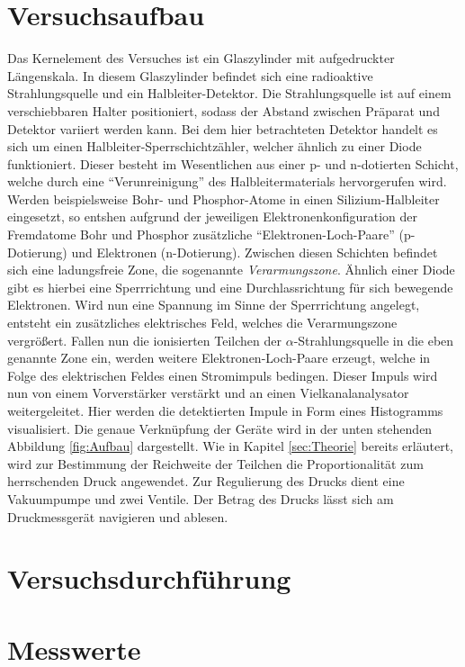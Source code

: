 


\section{Versuchsaufbau}
\label{sec:Versuchsaufbau}

Das Kernelement des Versuches ist ein Glaszylinder mit aufgedruckter Längenskala. In diesem Glaszylinder befindet 
sich eine radioaktive Strahlungsquelle und ein Halbleiter-Detektor. Die Strahlungsquelle ist auf einem verschiebbaren Halter 
positioniert, sodass der Abstand zwischen Präparat und Detektor variiert werden kann. Bei dem hier betrachteten Detektor 
handelt es sich um einen Halbleiter-Sperrschichtzähler, welcher ähnlich zu einer Diode funktioniert. Dieser besteht im 
Wesentlichen aus einer p- und n-dotierten Schicht, welche durch eine \enquote{Verunreinigung} des Halbleitermaterials 
hervorgerufen wird. Werden beispielsweise Bohr- und Phosphor-Atome in einen Silizium-Halbleiter eingesetzt, so entshen aufgrund 
der jeweiligen Elektronenkonfiguration der Fremdatome Bohr und Phosphor zusätzliche \enquote{Elektronen-Loch-Paare} (p-Dotierung)
und Elektronen (n-Dotierung). Zwischen diesen Schichten befindet sich eine ladungsfreie Zone, die sogenannte 
\emph{Verarmungszone}. Ähnlich einer Diode gibt es hierbei eine Sperrrichtung und eine Durchlassrichtung für sich bewegende Elektronen.
Wird nun eine Spannung im Sinne der Sperrrichtung angelegt, entsteht ein zusätzliches elektrisches Feld, welches die Verarmungszone 
vergrößert. Fallen nun die ionisierten Teilchen der $\alpha$-Strahlungsquelle in die eben genannte Zone ein, werden weitere
Elektronen-Loch-Paare erzeugt, welche in Folge des elektrischen Feldes einen Stromimpuls bedingen. Dieser Impuls wird nun von 
einem Vorverstärker verstärkt und an einen Vielkanalanalysator weitergeleitet. Hier werden die detektierten Impule in Form eines Histogramms visualisiert. 
Die genaue Verknüpfung der Geräte wird in der unten stehenden Abbildung \ref{fig:Aufbau} dargestellt. Wie in Kapitel \ref{sec:Theorie} bereits erläutert,
wird zur Bestimmung der Reichweite der Teilchen die Proportionalität zum herrschenden Druck angewendet. Zur Regulierung des Drucks dient eine Vakuumpumpe 
und zwei Ventile. Der Betrag des Drucks lässt sich am Druckmessgerät navigieren und ablesen.

\section{Versuchsdurchführung}
\label{sec:Versuchsdurchführung}



\section{Messwerte}
\label{sec:Messwerte}





